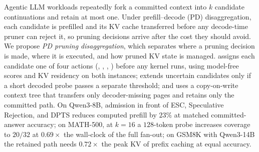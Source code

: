 Agentic LLM workloads repeatedly fork a committed context into $k$ candidate continuations and retain at most one.
Under prefill--decode (PD) disaggregation, each candidate is prefilled and its KV cache transferred before any decode-time pruner can reject it, so pruning decisions arrive after the cost they should avoid.
We propose \emph{PD pruning disaggregation}, which separates where a pruning decision is made, where it is executed, and how pruned KV state is managed.
\sys assigns each candidate one of four actions (\Hit, \Admit, \Probe, \Reject) before any kernel runs, using model-free scores and KV residency on both instances; extends uncertain candidates only if a short decoded probe passes a separate threshold; and uses a copy-on-write context tree that transfers only decoder-missing pages and retains only the committed path.
On Qwen3-8B, admission in front of ESC, Speculative Rejection, and DPTS reduces computed prefill by $23\%$ at matched committed-answer accuracy; on MATH-500, at $k{=}16$ a $128$-token probe increases coverage to $20/32$ at $0.69\times$ the wall-clock of the full fan-out; on GSM8K with Qwen3-14B the retained path needs $0.72\times$ the peak KV of prefix caching at equal accuracy.